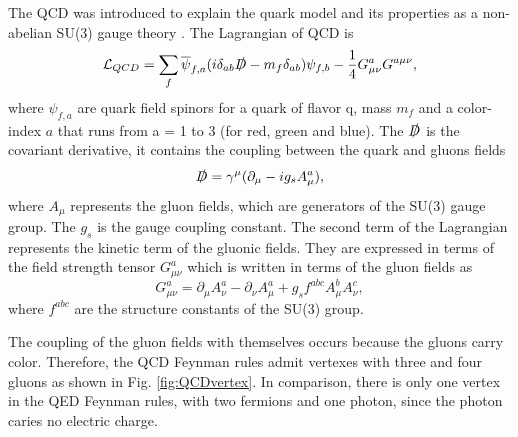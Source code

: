The QCD was introduced to explain the quark model and its properties as a non-abelian SU(3) gauge theory \cite{Fritzsch:1973pi}. The Lagrangian of QCD is
\begin{equation}
    \mathcal{L}_{QCD} = \sum_f \overline{\psi}_{f,a}(i\delta_{ab}\slashed{D} - m_f\delta_{ab})\psi_{f,b} - \frac{1}{4}G^a_{\mu\nu}G^{a\mu\nu},
\end{equation}
where $\psi_{f, a}$ are quark field spinors for a quark of flavor q, mass $m_f$ and a color-index $a$ that runs from a = 1 to 3 (for red, green and blue). The $\slashed{D}$ is the covariant derivative, it contains the coupling between the quark and gluons fields 
\begin{equation}
    \slashed{D} = \gamma^\mu(\partial_\mu - i g_s A^a_\mu),
\end{equation}
where $A_\mu$ represents the gluon fields, which are generators of the SU(3) gauge group. The $g_s$ is the gauge coupling constant. The second term of the Lagrangian represents the kinetic term of the gluonic fields. They are expressed in terms of the field strength tensor $G^a_{\mu\nu}$ which is written in terms of the gluon fields as
\begin{equation}
    G^a_{\mu\nu} = \partial_\mu A^a_\nu - \partial_\nu A^a_\mu + g_sf^{abc}A^b_\mu A^c_\nu,
\end{equation}
where $f^{abc}$ are the structure constants of the SU(3) group. 

The coupling of the gluon fields with themselves occurs because the gluons carry color. Therefore, the QCD Feynman rules admit vertexes with three and four gluons as shown in Fig. \ref{fig:QCDvertex}. In comparison, there is only one vertex in the QED Feynman rules, with two fermions and one photon, since the photon caries no electric charge.

